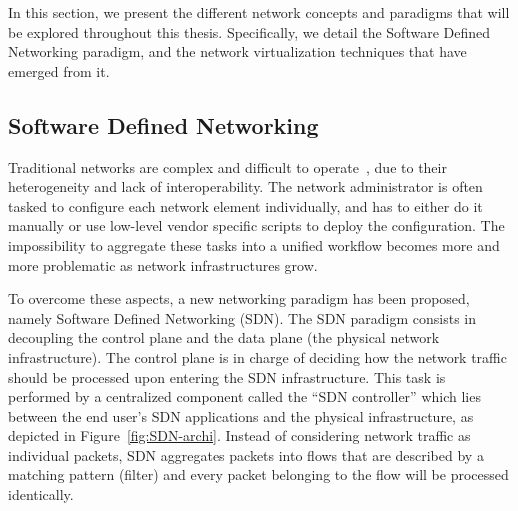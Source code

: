 In this section, we present the different network concepts and paradigms that will be explored throughout this thesis.
Specifically, we detail the Software Defined Networking paradigm, and the network virtualization techniques that have emerged from it.

\subsection{Software Defined Networking}

Traditional networks are complex and difficult to operate~\cite{complexnetworks}, due to their heterogeneity and lack of interoperability. The network administrator is often tasked to configure each network element individually, and has to either do it manually or use low-level vendor specific scripts to deploy the configuration. The impossibility to aggregate these tasks into a unified workflow becomes more and more problematic as network infrastructures grow.

To overcome these aspects, a new networking paradigm has been proposed, namely Software Defined Networking (SDN).
The SDN paradigm consists in decoupling the control plane and the data plane (the physical network infrastructure).
The control plane is in charge of deciding how the network traffic should be processed upon entering the SDN infrastructure.
This task is performed by a centralized component called the ``SDN controller'' which lies between the end user's SDN applications and the physical infrastructure, as depicted in Figure~\ref{fig:SDN-archi}. Instead of considering network traffic as individual packets, SDN aggregates packets into flows that are described by a matching pattern (filter) and every packet belonging to the flow will be processed identically. 



